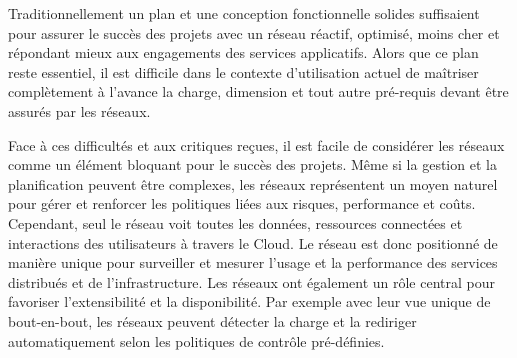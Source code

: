 
Traditionnellement un plan et une conception fonctionnelle solides suffisaient pour assurer le succès des projets avec un réseau réactif, optimisé, moins cher et répondant mieux aux engagements des services applicatifs. Alors que ce plan reste essentiel, il est difficile dans le contexte d'utilisation actuel de maîtriser complètement  à l'avance la charge, dimension et tout autre pré-requis devant être assurés par les réseaux.

Face à ces difficultés et aux critiques reçues, il est facile de considérer les réseaux comme un élément bloquant pour le succès des projets. Même si la gestion et la planification peuvent être complexes, les réseaux représentent un moyen naturel pour gérer et renforcer les politiques liées aux risques, performance et coûts. Cependant, seul le réseau voit toutes les données, ressources connectées et interactions des utilisateurs à travers le Cloud. Le réseau est donc positionné de manière unique pour surveiller et mesurer l'usage et la performance des services distribués et de l'infrastructure. Les réseaux ont également un rôle central pour favoriser l'extensibilité et la disponibilité. Par exemple avec leur vue unique de bout-en-bout, les réseaux peuvent détecter la charge et la rediriger automatiquement selon les politiques de contrôle pré-définies.

